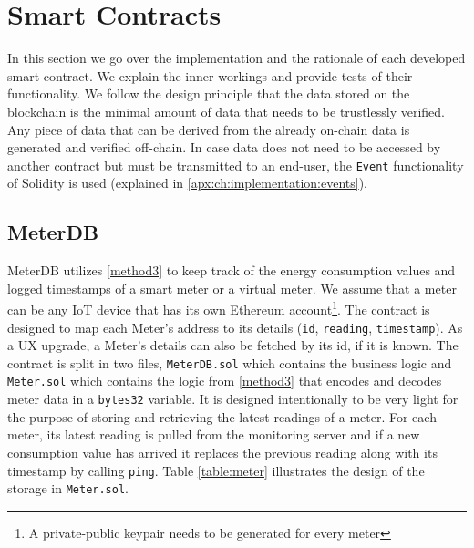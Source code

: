 \section{Smart Contracts} \label{ch:implementation:sc}
In this section we go over the implementation and the rationale of each developed smart contract. We explain the inner workings and provide tests of their functionality. We follow the design principle that the data stored on the blockchain is the minimal amount of data that needs to be trustlessly verified. Any piece of data that can be derived from the already on-chain data is generated and verified off-chain. In case data does not need to be accessed by another contract but must be transmitted to an end-user, the \texttt{Event} functionality of Solidity is used (explained in \ref{apx:ch:implementation:events}). 

\subsection{MeterDB}
MeterDB utilizes \ref{method3} to keep track of the energy consumption values and logged timestamps of a smart meter or a virtual meter. We assume that a meter can be any IoT device that has its own Ethereum account\footnote{A private-public keypair needs to be generated for every meter}. The contract is designed to map each Meter's address to its details (\texttt{id}, \texttt{reading}, \texttt{timestamp}). As a UX upgrade, a Meter's details can also be fetched by its id, if it is known. The contract is split in two files, \texttt{MeterDB.sol} which contains the business logic and \texttt{Meter.sol} which contains the logic from \ref{method3} that encodes and decodes meter data in a \texttt{bytes32} variable. It is designed intentionally to be very light for the purpose of storing and retrieving the latest readings of a meter. For each meter, its latest reading is pulled from the monitoring server and if a new consumption value has arrived it replaces the previous reading along with its timestamp by calling \texttt{ping}. Table \ref{table:meter} illustrates the design of the storage in \texttt{Meter.sol}.





